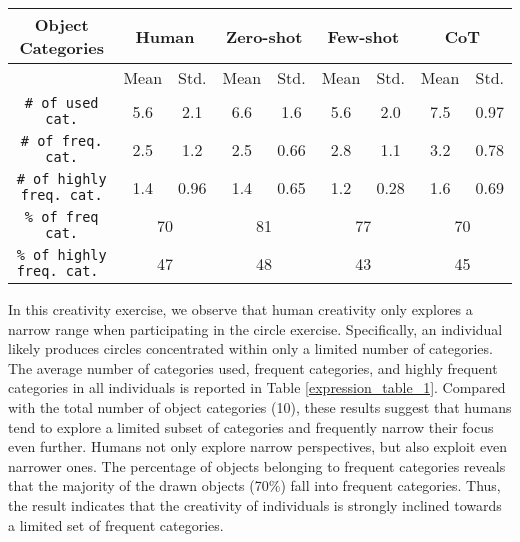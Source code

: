 \begin{table*}
  \caption{Quantative analysis of human and GenAI narrow creativity based on the distribution of drawn object categories. For the number of used categories, frequent categories, and highly frequent categories, a higher value indicates better performance. Conversely, for the percentage of objects within frequent and highly frequent categories, a lower value reflects better performance.}
  \label{expression_table_1}
  \begin{tabular}{ccccccccc}
    \toprule
    Object Categories                    &  \multicolumn{2}{c}{Human}          & \multicolumn{2}{c}{Zero-shot} & \multicolumn{2}{c}{Few-shot} &\multicolumn{2}{c}{CoT}\\
    \midrule
                                               & Mean & Std.          & Mean & Std.     & Mean & Std.  & Mean & Std. \\
    \texttt{\# of used cat.}             & 5.6 & 2.1            & 6.6 & 1.6       & 5.6 & 2.0     & 7.5 & 0.97 \\
    \texttt{\# of freq. cat.}            & 2.5 & 1.2            & 2.5 & 0.66       & 2.8 & 1.1     & 3.2 & 0.78 \\
    \texttt{\# of highly freq. cat.}     & 1.4 & 0.96            & 1.4 & 0.65      & 1.2 & 0.28     & 1.6 & 0.69\\ \hline
    \texttt{\% of freq cat.}             & \multicolumn{2}{c}{70}             & \multicolumn{2}{c}{81}        & \multicolumn{2}{c}{77}      & \multicolumn{2}{c}{70}   \\
    \texttt{\% of highly freq. cat. }    & \multicolumn{2}{c}{47}             & \multicolumn{2}{c}{48}        & \multicolumn{2}{c}{43}      &\multicolumn{2}{c}{45}  \\
    \bottomrule
  \end{tabular}
\end{table*}

In this creativity exercise, we observe that human creativity only explores a narrow range when participating in the circle exercise. 
Specifically, an individual likely produces circles concentrated within only a limited number of categories. 
The average number of categories used, frequent categories, and highly frequent categories in all individuals is reported in Table \ref{expression_table_1}. 
Compared with the total number of object categories (10), these results suggest that humans tend to explore a limited subset of categories and frequently narrow their focus even further. 
Humans not only explore narrow perspectives, but also exploit even narrower ones. 
The percentage of objects belonging to frequent categories reveals that the majority of the drawn objects (70\%) fall into frequent categories. 
Thus, the result indicates that the creativity of individuals is strongly inclined towards a limited set of frequent categories.

